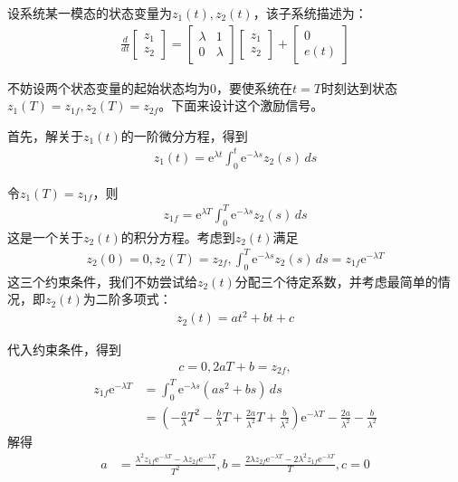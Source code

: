 \documentclass{ctexbook}
\begin{document}
\begin{example}
    设系统某一模态的状态变量为$z_1(t),z_2(t)$，该子系统描述为：\begin{align*}
    \frac{d}{dt}\begin{bmatrix}
    z_1\\
    z_2
    \end{bmatrix}=\begin{bmatrix}
    \lambda & 1\\
    0 & \lambda
    \end{bmatrix}\begin{bmatrix}
    z_1\\
    z_2
    \end{bmatrix}+\begin{bmatrix}
    0\\
    e(t)
    \end{bmatrix}
    \end{align*}

    不妨设两个状态变量的起始状态均为0，要使系统在$t=T$时刻达到状态$z_1(T)=z_{1f},z_2(T)=z_{2f}$。下面来设计这个激励信号。

    首先，解关于$z_1(t)$的一阶微分方程，得到\begin{align*}
    z_1(t)=\mathrm{e}^{\lambda t}\int_0^t \mathrm{e}^{-\lambda s}z_2(s)\,ds
    \end{align*}

    令$z_1(T)=z_{1f}$，则\begin{align*}
    z_{1f}=\mathrm{e}^{\lambda T}\int_0^T \mathrm{e}^{-\lambda s}z_2(s)\,ds
    \end{align*}
    这是一个关于$z_2(t)$的积分方程。考虑到$z_2(t)$满足\begin{align*}
    z_2(0)=0,z_2(T)=z_{2f},\int_{0}^T \mathrm{e}^{-\lambda s}z_2(s)\,ds=z_{1f}\mathrm{e}^{-\lambda T}
    \end{align*}
    这三个约束条件，我们不妨尝试给$z_2(t)$分配三个待定系数，并考虑最简单的情况，即$z_2(t)$为二阶多项式：\begin{align*}
    z_2(t)=a t^2+bt+c
    \end{align*}

    代入约束条件，得到\begin{align*}
    c=0,2aT+b=z_{2f},
    \end{align*}
    \begin{align*}
    z_{1f}\mathrm{e}^{-\lambda T}&=\int_0^T \mathrm{e}^{-\lambda s}(a s^2+bs)\,ds\\
    &=\left(-\frac{a}{\lambda}T^2-\frac{b}{\lambda}T+\frac{2a}{\lambda^2}T+\frac{b}{\lambda^2}\right)\mathrm{e}^{-\lambda T}-\frac{2a}{\lambda^2}-\frac{b}{\lambda^2}
    \end{align*}
    解得\begin{align*}
    a&=\frac{\lambda^2 z_{1f}\mathrm{e}^{-\lambda T}-\lambda z_{2f}\mathrm{e}^{-\lambda T}}{T^2},b=\frac{2\lambda z_{2f}\mathrm{e}^{-\lambda T}-2\lambda^2 z_{1f}\mathrm{e}^{-\lambda T}}{T},c=0
    \end{align*}


\end{example}
\end{document}

